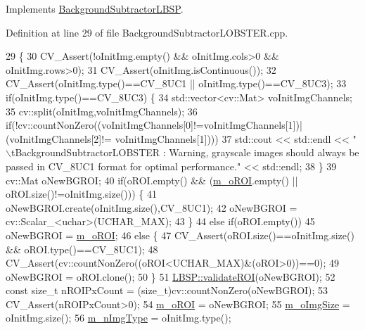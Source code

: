Implements \mbox{\hyperlink{class_background_subtractor_l_b_s_p_a3644bc10ec3beda6fad22c633fe0f8fb}{Background\+Subtractor\+L\+B\+SP}}.



Definition at line 29 of file Background\+Subtractor\+L\+O\+B\+S\+T\+E\+R.\+cpp.


\begin{DoxyCode}
29                                                                                      \{
30     CV\_Assert(!oInitImg.empty() && oInitImg.cols>0 && oInitImg.rows>0);
31     CV\_Assert(oInitImg.isContinuous());
32     CV\_Assert(oInitImg.type()==CV\_8UC1 || oInitImg.type()==CV\_8UC3);
33     \textcolor{keywordflow}{if}(oInitImg.type()==CV\_8UC3) \{
34         std::vector<cv::Mat> voInitImgChannels;
35         cv::split(oInitImg,voInitImgChannels);
36         \textcolor{keywordflow}{if}(!cv::countNonZero((voInitImgChannels[0]!=voInitImgChannels[1])|(voInitImgChannels[2]!=
      voInitImgChannels[1])))
37             std::cout << std::endl << \textcolor{stringliteral}{"\(\backslash\)tBackgroundSubtractorLOBSTER : Warning, grayscale images should
       always be passed in CV\_8UC1 format for optimal performance."} << std::endl;
38     \}
39     cv::Mat oNewBGROI;
40     \textcolor{keywordflow}{if}(oROI.empty() && (\mbox{\hyperlink{class_background_subtractor_l_b_s_p_a53fe98bd2489d95de5292467145901e9}{m\_oROI}}.empty() || oROI.size()!=oInitImg.size())) \{
41         oNewBGROI.create(oInitImg.size(),CV\_8UC1);
42         oNewBGROI = cv::Scalar\_<uchar>(UCHAR\_MAX);
43     \}
44     \textcolor{keywordflow}{else} \textcolor{keywordflow}{if}(oROI.empty())
45         oNewBGROI = \mbox{\hyperlink{class_background_subtractor_l_b_s_p_a53fe98bd2489d95de5292467145901e9}{m\_oROI}};
46     \textcolor{keywordflow}{else} \{
47         CV\_Assert(oROI.size()==oInitImg.size() && oROI.type()==CV\_8UC1);
48         CV\_Assert(cv::countNonZero((oROI<UCHAR\_MAX)&(oROI>0))==0);
49         oNewBGROI = oROI.clone();
50     \}
51     \mbox{\hyperlink{class_l_b_s_p_ad97557be4bc6cfd7b0fa4b01ab8f8c55}{LBSP::validateROI}}(oNewBGROI);
52     \textcolor{keyword}{const} \textcolor{keywordtype}{size\_t} nROIPxCount = (size\_t)cv::countNonZero(oNewBGROI);
53     CV\_Assert(nROIPxCount>0);
54     \mbox{\hyperlink{class_background_subtractor_l_b_s_p_a53fe98bd2489d95de5292467145901e9}{m\_oROI}} = oNewBGROI;
55     \mbox{\hyperlink{class_background_subtractor_l_b_s_p_a732d5e6ae35fb0e858cadb3af5ce08a2}{m\_oImgSize}} = oInitImg.size();
56     \mbox{\hyperlink{class_background_subtractor_l_b_s_p_a7d2f52ecd5ff56e42da86f97e0ad93b5}{m\_nImgType}} = oInitImg.type();

\end{DoxyCode}
